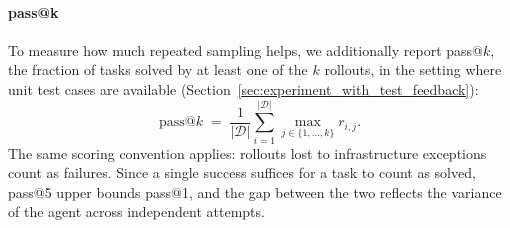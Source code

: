 \documentclass{article}
\begin{document}
\paragraph{pass@k}
To measure how much repeated sampling helps, we additionally report pass@$k$, the fraction of tasks solved by at least one of the $k$ rollouts, in the setting where unit test cases are available (Section~\ref{sec:experiment_with_test_feedback}):
\begin{equation}
    \mathrm{pass@}k
    \;=\;
    \frac{1}{\lvert \mathcal{D} \rvert}
    \sum_{i=1}^{\lvert \mathcal{D} \rvert}
    \max_{j \in \{1, \dots, k\}} r_{i,j}.
    \label{eq:passk}
\end{equation}
The same scoring convention applies: rollouts lost to infrastructure exceptions count as failures. Since a single success suffices for a task to count as solved, pass@5 upper bounds pass@1, and the gap between the two reflects the variance of the agent across independent attempts.
\end{document}
